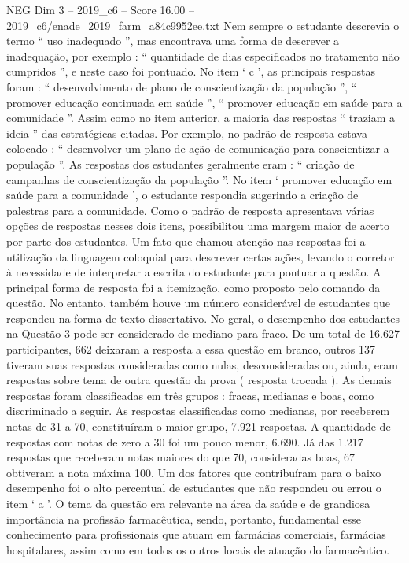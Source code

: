 \begin{textsample}{NEG Dim 3 – 2019\_c6 – Score 16.00 – 2019\_c6/enade\_2019\_farm\_a84c9952ee.txt}
Nem sempre o estudante descrevia o termo “ uso inadequado ”, mas encontrava uma forma de descrever a inadequação, por exemplo : “ quantidade de dias especificados no tratamento não cumpridos ”, e neste caso foi pontuado.
No item ‘ c ’, as principais respostas foram : “ desenvolvimento de plano de conscientização da população ”, “ promover educação continuada em saúde ”, “ promover educação em saúde para a comunidade ”.
Assim como no item anterior, a maioria das respostas “ traziam a ideia ” das estratégicas citadas.
Por exemplo, no padrão de resposta estava colocado : “ desenvolver um plano de ação de comunicação para conscientizar a população ”.
As respostas dos estudantes geralmente eram : “ criação de campanhas de conscientização da população ”.
No item ‘ promover educação em saúde para a comunidade ’, o estudante respondia sugerindo a criação de palestras para a comunidade.
Como o padrão de resposta apresentava várias opções de respostas nesses dois itens, possibilitou uma margem maior de acerto por parte dos estudantes.
Um fato que chamou atenção nas respostas foi a utilização da linguagem coloquial para descrever certas ações, levando o corretor à necessidade de interpretar a escrita do estudante para pontuar a questão.
A principal forma de resposta foi a itemização, como proposto pelo comando da questão.
No entanto, também houve um número considerável de estudantes que respondeu na forma de texto dissertativo.
No geral, o desempenho dos estudantes na Questão 3 pode ser considerado de mediano para fraco.
De um total de 16.627 participantes, 662 deixaram a resposta a essa questão em branco, outros 137 tiveram suas respostas consideradas como nulas, desconsideradas ou, ainda, eram respostas sobre tema de outra questão da prova ( resposta trocada ).
As demais respostas foram classificadas em três grupos : fracas, medianas e boas, como discriminado a seguir.
As respostas classificadas como medianas, por receberem notas de 31 a 70, constituíram o maior grupo, 7.921 respostas.
A quantidade de respostas com notas de zero a 30 foi um pouco menor, 6.690.
Já das 1.217 respostas que receberam notas maiores do que 70, consideradas boas, 67 obtiveram a nota máxima 100.
Um dos fatores que contribuíram para o baixo desempenho foi o alto percentual de estudantes que não respondeu ou errou o item ‘ a ’.
O tema da questão era relevante na área da saúde e de grandiosa importância na profissão farmacêutica, sendo, portanto, fundamental esse conhecimento para profissionais que atuam em farmácias comerciais, farmácias hospitalares, assim como em todos os outros locais de atuação do farmacêutico.

\end{textsample}
